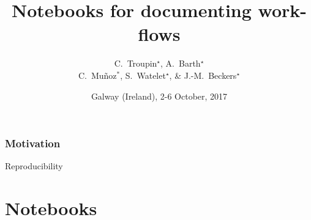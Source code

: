 

\title{Notebooks for documenting work-flows}
\author[C.~Troupin]{C.~Troupin$^{\star}$, A.~Barth$^{\star}$ \\ C.~Muñoz$^{\ast}$, S.~Watelet$^{\star}$,  \& J.-M.~Beckers$^{\star}$}


\date{Galway (Ireland), 2-6 October, 2017}



\begin{frame}
\maketitle
\end{frame}

\begin{frame}
\frametitle{Motivation}

Reproducibility

\end{frame}


\section{Notebooks}

